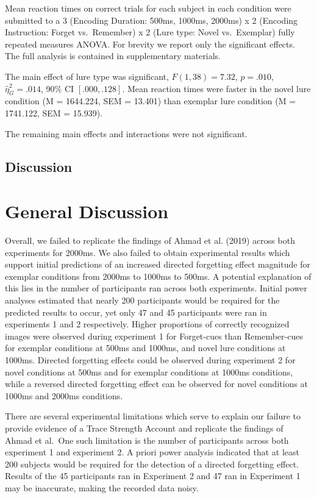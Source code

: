 \documentclass[
  english,
  man,floatsintext]{apa6}
\begin{document}
Mean reaction times on correct trials for each subject in each condition were submitted to a 3 (Encoding Duration: 500ms, 1000ms, 2000ms) x 2 (Encoding Instruction: Forget vs.~Remember) x 2 (Lure type: Novel vs.~Exemplar) fully repeated measures ANOVA. For brevity we report only the significant effects. The full analysis is contained in supplementary materials.

The main effect of lure type was significant, \(F(1, 38) = 7.32\), \(p = .010\), \(\hat{\eta}^2_G = .014\), 90\% CI \([.000, .128]\). Mean reaction times were faster in the novel lure condition (M = 1644.224, SEM = 13.401) than exemplar lure condition (M = 1741.122, SEM = 15.939).

The remaining main effects and interactions were not significant.

\hypertarget{discussion-1}{%
\subsection{Discussion}\label{discussion-1}}

\newpage

\hypertarget{general-discussion}{%
\section{General Discussion}\label{general-discussion}}

Overall, we failed to replicate the findings of Ahmad et al. (2019) across both experiments for 2000ms. We also failed to obtain experimental results which support initial predictions of an increased directed forgetting effect magnitude for exemplar conditions from 2000ms to 1000ms to 500ms. A potential explanation of this lies in the number of participants ran across both experiments. Initial power analyses estimated that nearly 200 participants would be required for the predicted results to occur, yet only 47 and 45 participants were ran in experiments 1 and 2 respectively. Higher proportions of correctly recognized images were observed during experiment 1 for Forget-cues than Remember-cues for exemplar conditions at 500ms and 1000ms, and novel lure conditions at 1000ms. Directed forgetting effects could be observed during experiment 2 for novel conditions at 500ms and for exemplar conditions at 1000ms conditions, while a reversed directed forgetting effect can be observed for novel conditions at 1000ms and 2000ms conditions.

There are several experimental limitations which serve to explain our failure to provide evidence of a Trace Strength Account and replicate the findings of Ahmad et al.~One such limitation is the number of participants across both experiment 1 and experiment 2. A priori power analysis indicated that at least 200 subjects would be required for the detection of a directed forgetting effect. Results of the 45 participants ran in Experiment 2 and 47 ran in Experiment 1 may be inaccurate, making the recorded data noisy.
\end{document}
